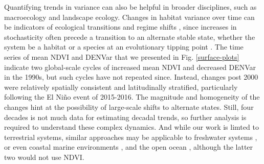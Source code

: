 \documentclass{article}
\begin{document}

Quantifying trends in variance can also be helpful in broader disciplines, such as macroecology and landscape ecology. Changes in habitat variance over time can be indicators of ecological transitions and regime shifts \citep{carpenter_rising_2006, bunting_increased_2016, bjorndahl_abrupt_2022}, since increases in stochasticity often precede a transition to an alternate stable state, whether the system be a habitat \citep{hastings_effects_2021} or a species at an evolutionary tipping point \citep{botero_evolutionary_2015}. The time series of mean NDVI and DENVar that we presented in Fig. \ref{surface-plots} indicate two global-scale cycles of increased mean NDVI and decreased DENVar in the 1990s, but such cycles have not repeated since. Instead, changes post 2000 were relatively spatially consistent and latitudinally stratified, particularly following the El Niño event of 2015-2016. The magnitude and homogeneity of the changes hint at the possibility of large-scale shifts to alternate states. Still, four decades is not much data for estimating decadal trends, so further analysis is required to understand these complex dynamics. And while our work is limted to terrestrial systems, similar approaches may be applicable to freshwater systems \citep{chegoonian_comparative_2023}, or even coastal marine environments \citep{zheng_remote_2017}, and the open ocean \citep{hong_global_2023}, although the latter two would not use NDVI.
\end{document}
